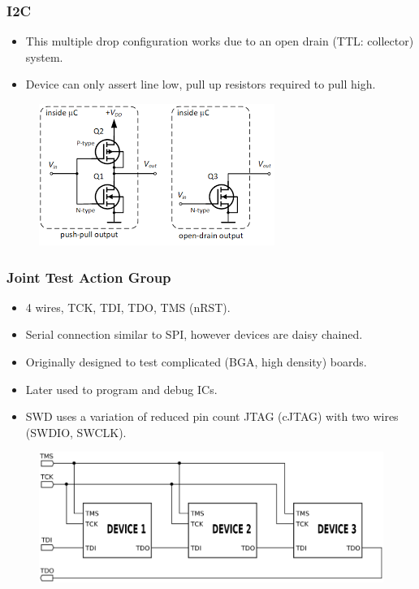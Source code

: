 \documentclass[t]{beamer}
\begin{document}

\begin{frame}[t]
\frametitle{I2C}
\begin{itemize}
	\item This multiple drop configuration works due to an open drain (TTL: collector) system. 
	\item Device can only assert line low, pull up resistors required to pull high.  
\end{itemize}
\begin{figure}
	\includegraphics[width=0.5\linewidth]{openDrain.png}
\end{figure}

\end{frame}


\begin{frame}[t]
\frametitle{Joint Test Action Group}
\begin{itemize}
	\item 4 wires, TCK, TDI, TDO, TMS (nRST).
	\item Serial connection similar to SPI, however devices are daisy chained. 
	\item Originally designed to test complicated (BGA, high density) boards.
	\item Later used to program and debug ICs.
	\item SWD uses a variation of reduced pin count JTAG (cJTAG) with two wires (SWDIO, SWCLK). 
\end{itemize}
\begin{figure}
	\includegraphics[width=0.7\linewidth]{jtagChain.png}
\end{figure}

\end{frame}
\end{document}
